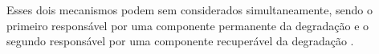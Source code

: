 





Esses dois mecanismos podem sem considerados simultaneamente, sendo o primeiro responsável por uma componente permanente da degradação e o segundo responsável por uma componente recuperável da degradação \cite{Banaszeski}.

